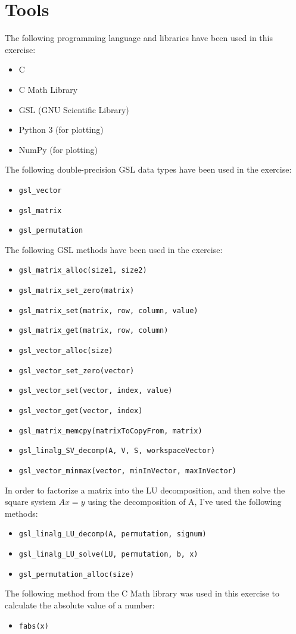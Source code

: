 \documentclass{article}
\newcommand{\code}{\texttt}
\begin{document}
\section{Tools}
The following programming language and libraries have been used in this exercise:
\begin{itemize}
  \item C
  \item C Math Library
  \item GSL (GNU Scientific Library)
  \item Python 3 (for plotting)
  \item NumPy (for plotting)
\end{itemize}
The following double-precision GSL data types have been used in the exercise:
\begin{itemize}
  \item \code{gsl\_vector}
  \item \code{gsl\_matrix}
  \item \code{gsl\_permutation}
\end{itemize}
The following GSL methods have been used in the exercise:
\begin{itemize}
  \item \code{gsl\_matrix\_alloc(size1, size2)}
  \item \code{gsl\_matrix\_set\_zero(matrix)}
  \item \code{gsl\_matrix\_set(matrix, row, column, value)}
  \item \code{gsl\_matrix\_get(matrix, row, column)}
  \item \code{gsl\_vector\_alloc(size)}
  \item \code{gsl\_vector\_set\_zero(vector)}
  \item \code{gsl\_vector\_set(vector, index, value)}
  \item \code{gsl\_vector\_get(vector, index)}
  \item \code{gsl\_matrix\_memcpy(matrixToCopyFrom, matrix)}
  \item \code{gsl\_linalg\_SV\_decomp(A, V, S, workspaceVector)}
  \item \code{gsl\_vector\_minmax(vector, minInVector, maxInVector)}
\end{itemize}
In order to factorize a matrix into the LU decomposition, and then solve the square system $Ax=y$ using the decomposition of A, I've used the following methods:
\begin{itemize}
  \item \code{gsl\_linalg\_LU\_decomp(A, permutation, signum)}
  \item \code{gsl\_linalg\_LU\_solve(LU, permutation, b, x)}
  \item \code{gsl\_permutation\_alloc(size)}
\end{itemize}
The following method from the C Math library was used in this exercise to calculate the absolute value of a number:
\begin{itemize}
  \item \code{fabs(x)}
\end{itemize}
  
\end{document}
